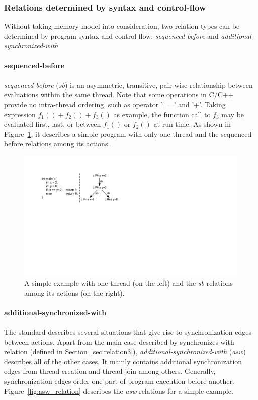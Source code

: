 \documentclass[preprint, numbers, 10pt]{sigplanconf}
\begin{document}
\subsubsection{Relations determined by syntax and control-flow}
\label{sec:relation1}

Without taking memory model into consideration, two relation types 
can be determined by program syntax and control-flow: 
\textit{sequenced-before} and \textit{additional-synchronized-with}.


\paragraph{sequenced-before} 
\textit{sequenced-before} (\textit{sb}) is an asymmetric, transitive, 
pair-wise relationship between evaluations within the same thread.
Note that some operations in C/C++ provide no intra-thread 
ordering, such as operator '==' and '+'. 
Taking expression \textit{$f_1() + f_2() + f_3()$} as example, 
the function call to $f_3$ may be evaluated first, last, 
or between $f_1()$ or $f_2()$ at run time. As shown in Figure~\ref{fig:sb_relation},
it describes a simple program with only one thread and the sequenced-before
relations among its actions. 

\begin{figure}%
\centering\includegraphics[scale=0.5]{sb_Relation.pdf} %
\caption{A simple example with one thread (on the left) and the \textit{sb}
relations among its actions (on the right).}
\label{fig:sb_relation}
\end{figure}

\paragraph{additional-synchronized-with}
The standard describes several situations that 
give rise to synchronization edges between actions. 
Apart from the main case described by synchronizes-with relation
(defined in Section~\ref{sec:relation3}), \textit{additional-synchronized-with} (\textit{asw}) 
describes all of the other cases. It mainly contains additional synchronization 
edges from thread creation and thread join among others.
Generally, synchronization edges order one part of program execution 
before another. Figure~\ref{fig:asw_relation} describes the \textit{asw} relations
for a simple example. 
\end{document}
